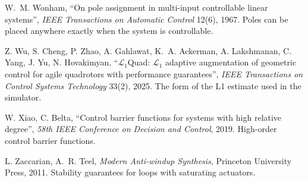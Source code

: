 \begin{description}[leftmargin=1.5em, itemindent=-1.5em, itemsep=5pt, font=\normalfont]
  \item[] W.~M. Wonham, \enquote{On pole assignment in multi-input controllable linear systems}, \emph{IEEE Transactions on Automatic Control} 12(6), 1967. Poles can be placed anywhere exactly when the system is controllable.
  \item[] Z. Wu, S. Cheng, P. Zhao, A. Gahlawat, K.~A. Ackerman, A. Lakshmanan, C. Yang, J. Yu, N. Hovakimyan, \enquote{$\mathcal L_1$Quad: $\mathcal L_1$ adaptive augmentation of geometric control for agile quadrotors with performance guarantees}, \emph{IEEE Transactions on Control Systems Technology} 33(2), 2025. The form of the L1 estimate used in the simulator.
  \item[] W. Xiao, C. Belta, \enquote{Control barrier functions for systems with high relative degree}, \emph{58th IEEE Conference on Decision and Control}, 2019. High-order control barrier functions.
  \item[] L. Zaccarian, A.~R. Teel, \emph{Modern Anti-windup Synthesis}, Princeton University Press, 2011. Stability guarantees for loops with saturating actuators.
\end{description}
